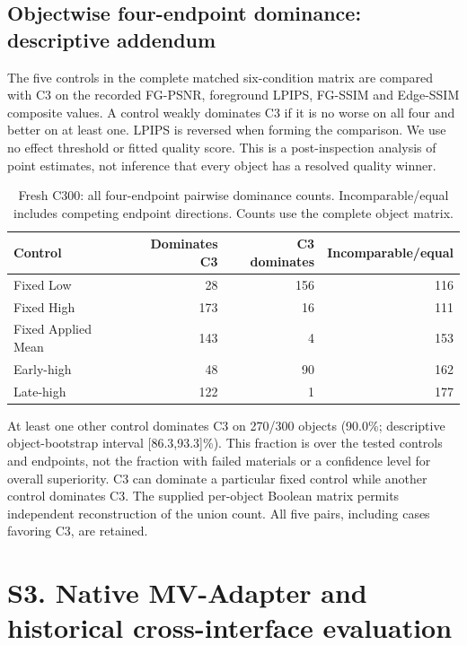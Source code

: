 \documentclass[11pt]{article}
\begin{document}
\clearpage

\FloatBarrier
\subsection*{Objectwise four-endpoint dominance: descriptive addendum}
The five controls in the complete matched six-condition matrix are compared with C3 on the recorded FG-PSNR, foreground LPIPS, FG-SSIM and Edge-SSIM composite values. A control weakly dominates C3 if it is no worse on all four and better on at least one. LPIPS is reversed when forming the comparison. We use no effect threshold or fitted quality score. This is a post-inspection analysis of point estimates, not inference that every object has a resolved quality winner.

\begin{table}[ht]\centering\small
\caption{Fresh C300: all four-endpoint pairwise dominance counts. Incomparable/equal includes competing endpoint directions. Counts use the complete object matrix.}\label{tab:dominance015}
\begin{tabular}{lrrr}\toprule Control & Dominates C3 & C3 dominates & Incomparable/equal \\
\midrule
Fixed Low & 28 & 156 & 116 \\
Fixed High & 173 & 16 & 111 \\
Fixed Applied Mean & 143 & 4 & 153 \\
Early-high & 48 & 90 & 162 \\
Late-high & 122 & 1 & 177 \\

\bottomrule\end{tabular}
\end{table}
At least one other control dominates C3 on 270/300 objects (90.0\%; descriptive object-bootstrap interval [86.3,93.3]\%). This fraction is over the tested controls and endpoints, not the fraction with failed materials or a confidence level for overall superiority. C3 can dominate a particular fixed control while another control dominates C3. The supplied per-object Boolean matrix permits independent reconstruction of the union count. All five pairs, including cases favoring C3, are retained.

\FloatBarrier
\section*{S3. Native MV-Adapter and historical cross-interface evaluation}
\label{supp:group3}
\end{document}
